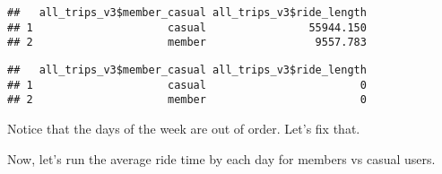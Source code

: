 \documentclass[
]{article}
\newenvironment{Shaded}{\begin{snugshade}}{\end{snugshade}}
\newcommand{\AttributeTok}[1]{\textcolor[rgb]{0.77,0.63,0.00}{#1}}
\newcommand{\FunctionTok}[1]{\textcolor[rgb]{0.00,0.00,0.00}{#1}}
\newcommand{\NormalTok}[1]{#1}
\newcommand{\OtherTok}[1]{\textcolor[rgb]{0.56,0.35,0.01}{#1}}
\newcommand{\SpecialCharTok}[1]{\textcolor[rgb]{0.00,0.00,0.00}{#1}}
\newcommand{\StringTok}[1]{\textcolor[rgb]{0.31,0.60,0.02}{#1}}
\begin{document}
\begin{Shaded}
\end{Shaded}

\begin{verbatim}
##   all_trips_v3$member_casual all_trips_v3$ride_length
## 1                     casual                55944.150
## 2                     member                 9557.783
\end{verbatim}

\begin{Shaded}
\end{Shaded}

\begin{verbatim}
##   all_trips_v3$member_casual all_trips_v3$ride_length
## 1                     casual                        0
## 2                     member                        0
\end{verbatim}

Notice that the days of the week are out of order. Let's fix that.

\begin{Shaded}
\end{Shaded}

Now, let's run the average ride time by each day for members vs casual
users.
\end{document}
